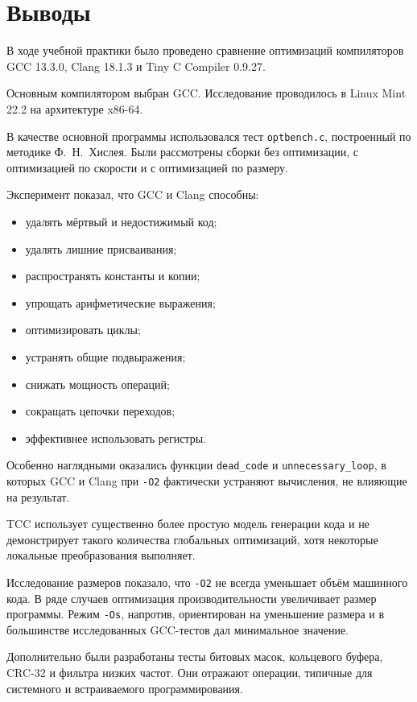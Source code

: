 \documentclass[12pt,a4paper]{article}
\begin{document}
\section{Выводы}
В ходе учебной практики было проведено сравнение оптимизаций компиляторов GCC 13.3.0, Clang 18.1.3 и Tiny C Compiler 0.9.27.

Основным компилятором выбран GCC. Исследование проводилось в Linux Mint 22.2 на архитектуре x86-64.

В качестве основной программы использовался тест \texttt{optbench.c}, построенный по методике Ф.~Н.~Хислея. Были рассмотрены сборки без оптимизации, с оптимизацией по скорости и с оптимизацией по размеру.

Эксперимент показал, что GCC и Clang способны:
\begin{itemize}
    \item удалять мёртвый и недостижимый код;
    \item удалять лишние присваивания;
    \item распространять константы и копии;
    \item упрощать арифметические выражения;
    \item оптимизировать циклы;
    \item устранять общие подвыражения;
    \item снижать мощность операций;
    \item сокращать цепочки переходов;
    \item эффективнее использовать регистры.
\end{itemize}

Особенно наглядными оказались функции \texttt{dead\_code} и \texttt{unnecessary\_loop}, в которых GCC и Clang при \texttt{-O2} фактически устраняют вычисления, не влияющие на результат.

TCC использует существенно более простую модель генерации кода и не демонстрирует такого количества глобальных оптимизаций, хотя некоторые локальные преобразования выполняет.

Исследование размеров показало, что \texttt{-O2} не всегда уменьшает объём машинного кода. В ряде случаев оптимизация производительности увеличивает размер программы. Режим \texttt{-Os}, напротив, ориентирован на уменьшение размера и в большинстве исследованных GCC-тестов дал минимальное значение.

Дополнительно были разработаны тесты битовых масок, кольцевого буфера, CRC-32 и фильтра низких частот. Они отражают операции, типичные для системного и встраиваемого программирования.
\end{document}
